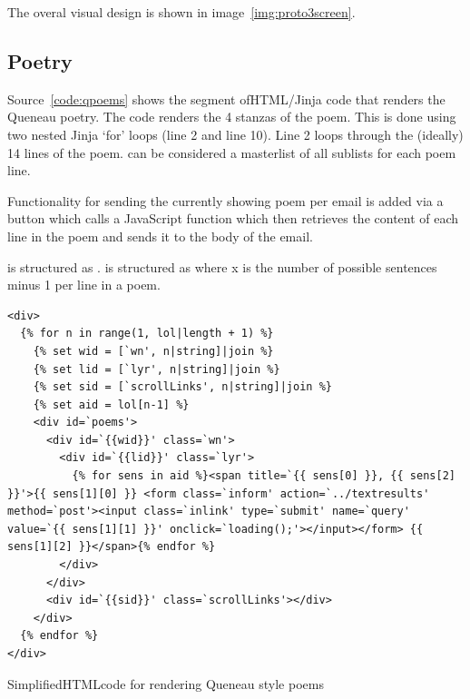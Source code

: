 The overal visual design is shown in image~\ref{img:proto3screen}.


\subsection{Poetry}
\label{s:poetry}

Source~\ref{code:qpoems} shows the segment of\ac{HTML}/Jinja code that renders the Queneau poetry. The code renders the 4 stanzas of the poem. This is done using two nested Jinja `for' loops (line 2 and line 10). Line 2 loops through the (ideally) 14 lines of the poem.  can be considered a masterlist of all sublists for each poem line.

Functionality for sending the currently showing poem per email is added via a button which calls a JavaScript function  which then retrieves the content of each line in the poem and sends it to the body of the email. 

 is structured as .  is structured as  where x is the number of possible sentences minus 1 per line in a poem.


\begin{listing}[!htbp] %
  \begin{verbatim}
<div>
  {% for n in range(1, lol|length + 1) %}
    {% set wid = [`wn', n|string]|join %}
    {% set lid = [`lyr', n|string]|join %}
    {% set sid = [`scrollLinks', n|string]|join %}
    {% set aid = lol[n-1] %}
    <div id=`poems'>
      <div id=`{{wid}}' class=`wn'>
        <div id=`{{lid}}' class=`lyr'>
          {% for sens in aid %}<span title=`{{ sens[0] }}, {{ sens[2] }}'>{{ sens[1][0] }} <form class=`inform' action=`../textresults' method=`post'><input class=`inlink' type=`submit' name=`query' value=`{{ sens[1][1] }}' onclick=`loading();'></input></form> {{ sens[1][2] }}</span>{% endfor %}
        </div>
      </div>
      <div id=`{{sid}}' class=`scrollLinks'></div>
    </div>
  {% endfor %}
</div>
  \end{verbatim}
\caption[HTML for Queneau style poems]{Simplified\ac{HTML}code for rendering Queneau style poems}
\label{code:qpoems}
\end{listing}


